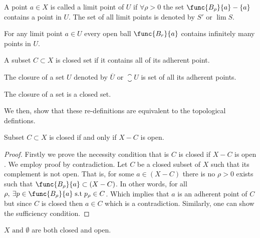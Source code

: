 \begin{definition} 
    A point \(a \in X\) is called a limit point of \(U\) if \(\forall \rho > 0\) the set \(\func{B_\rho}{a} - \{ a\}\) contains a point in \(U\). The set of all limit points is denoted by \(S'\) or \(\lim S\).
\end{definition}

\begin{note}
    For any limit point \(a \in U\) every open ball \(\func{B_r}{a}\) contains infinitely many points in \(U\).
\end{note}

\begin{definition} 
    A subset \(C \subset X\) is closed set if it contains all of its adherent point.
\end{definition}

\begin{definition} [Closure]
    The closure of a set \(U\) denoted by \(\overline{U}\) or \(\closure U\) is set of all its adherent points.
\end{definition}

\begin{note}
    The closure of a set is a closed set.
\end{note}

We then, show that these re-definitions are equivalent to the topological defintions.

\begin{theorem}
    Subset \(C \subset X\) is closed if and only if \(X - C\) is open.
\end{theorem}

\begin{proof}
    Firstly we prove the necessity condition that is \(C\) is closed if \(X - C\) is open . We employ proof by contradiction. Let \(C\) be a closed subset of \(X\) such that its complement is not open. That is, for some \(a \in (X - C)\) there is no \(\rho > 0\) exists such that \(\func{B_\rho}{a} \subset (X-C)\). In other words, for all \(\rho,\: \exists p \in \func{B_\rho}{a} \;\mathrm{ s.t }\; p_\rho \in C\). Which implies that \(a\) is an adherent point of \(C\) but since \(C\) is closed then \(a \in C\) which is a contradiction. Similarly, one can show the sufficiency condition.
\end{proof}

\begin{corollary}
    \(X \text{ and } \emptyset\) are both closed and open.
\end{corollary}

